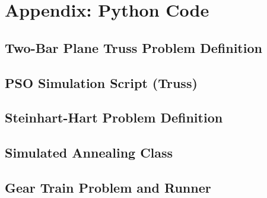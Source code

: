 \section{Appendix: Python Code}

\subsection{Two-Bar Plane Truss Problem Definition}


\subsection{PSO Simulation Script (Truss)}


\subsection{Steinhart-Hart Problem Definition}


\subsection{Simulated Annealing Class}


\subsection{Gear Train Problem and Runner}



